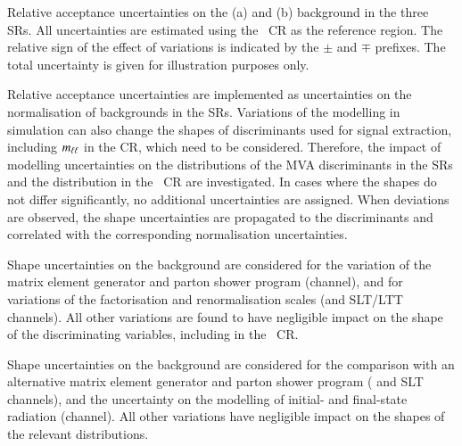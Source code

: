 \begin{table}[htbp]
  \centering

  \caption{Relative acceptance uncertainties on the \ZHF (a) and \ttbar (b)
    background in the three SRs. All uncertainties are estimated using the
    \ZHF~CR as the reference region. The relative sign of the effect of
    variations is indicated by the $\pm$ and $\mp$ prefixes. The total
    uncertainty is given for illustration purposes only.}

  \begin{subtable}[t]{0.95\textwidth}
    \centering
    \label{tab:uncertainties_zhf_extrapol}

    
  \end{subtable}

  \vspace{12pt}

  \begin{subtable}[t]{0.95\textwidth}
    \centering
    \label{tab:uncertainties_ttbar_extrapol}

    
  \end{subtable}
\end{table}

Relative acceptance uncertainties are implemented as uncertainties on the
normalisation of backgrounds in the SRs. Variations of the modelling in
simulation can also change the shapes of discriminants used for signal
extraction, including $m_{\ell\ell}$ in the \ZHF CR, which need to be
considered. Therefore, the impact of modelling uncertainties on the
distributions of the MVA discriminants in the SRs and the \mll distribution in
the \ZHF~CR are investigated. In cases where the shapes do not differ
significantly, no additional uncertainties are assigned. When deviations are
observed, the shape uncertainties are propagated to the discriminants and
correlated with the corresponding normalisation uncertainties.

Shape uncertainties on the \ZHF background are considered for the variation of
the matrix element generator and parton shower program (\hadhad channel), and
for variations of the factorisation and renormalisation scales (\hadhad and
\lephad SLT/LTT channels). All other variations are found to have negligible
impact on the shape of the discriminating variables, including \mll in the
\ZHF~CR.

Shape uncertainties on the \ttbar background are considered for the comparison
with an alternative matrix element generator and parton shower program (\hadhad
and \lephad SLT channels), and the uncertainty on the modelling of initial- and
final-state radiation (\hadhad channel). All other variations have negligible
impact on the shapes of the relevant distributions.


